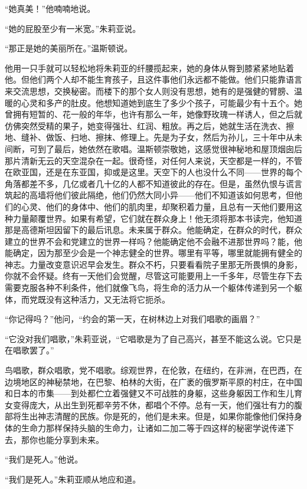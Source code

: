 ``她真美！''他喃喃地说。

``她的屁股至少有一米宽。''朱莉亚说。

``那正是她的美丽所在。''温斯顿说。

他用一只手就可以轻松地将朱莉亚的纤腰揽起来，她的身体从臀到膝紧紧地贴着他。但他们两个人却不能生育孩子，且这件事他们永远都不能做。他们只能靠语言来交流思想，交换秘密。而楼下的那个女人则没有思想，她有的是强健的臂膀、温暖的心灵和多产的肚皮。他想知道她到底生了多少个孩子，可能最少有十五个。她曾拥有短暂的、花一般的年华，也许有那么一年，她像野玫瑰一样诱人，但之后就仿佛突然受精的果子，她变得强壮、红润、粗放。再之后，她就生活在洗衣、擦地、缝补、做饭、扫地、擦抹、修理上。先是为子女，然后为孙儿，三十年中从未间断，可到了最后，她依然在歌唱。温斯顿崇敬她，这感觉很神秘地和屋顶烟囱后那片清新无云的天空混杂在一起。很奇怪，对任何人来说，天空都是一样的，不管在欧亚国，还是在东亚国，抑或是这里。天空下的人也没什么不同------世界的每个角落都差不多，几亿或者几十亿的人都不知道彼此的存在。但是，虽然仇恨与谎言筑起的高墙将他们彼此隔绝，他们仍然大同小异------他们不知道该如何思考，但他们的心灵、他们的身体中、他们的肌肉里，却聚积着力量，且总有一天他们要用这种力量颠覆世界。如果有希望，它们就在群众身上！他无须将那本书读完，他知道那是高德斯坦因留下的最后讯息。未来属于群众。他能确定，在群众的时代，群众建立的世界不会和党建立的世界一样吗？他能确定他不会融不进那世界吗？能，他能确定，因为那至少会是一个神志健全的世界。哪里有平等，哪里就能拥有健全的神志。力量改变意识迟早会发生。群众不朽，只要看看院子里那无所畏惧的身影，你就不会怀疑。终有一天他们会觉醒，尽管这可能要用上一千多年，尽管生存下去需要克服各种不利条件，他们就像飞鸟，将生命的活力从一个躯体传递到另一个躯体，而党既没有这种活力，又无法将它扼杀。

``你记得吗？''他问，``约会的第一天，在树林边上对我们唱歌的画眉？''

``它没对我们唱歌，''朱莉亚说，``它唱歌是为了自己高兴，甚至不能这么说。它只是在唱歌罢了。''

鸟唱歌，群众唱歌，党不唱歌。综观世界，在伦敦，在纽约，在非洲，在巴西，在边境地区的神秘禁地，在巴黎、柏林的大街，在广袤的俄罗斯平原的村庄，在中国和日本的市集------到处都伫立着强健又不可战胜的身躯，这些身躯因工作和生儿育女变得庞大，从出生到死都辛劳不休，都唱个不停。总有一天，他们强壮有力的腹部将生出神志清醒的民族。你是死的，他们是未来。但是，如果你能像他们保持身体的生命力那样保持头脑的生命力，让诸如二加二等于四这样的秘密学说传递下去，那你也能分享到未来。

``我们是死人。''他说。

``我们是死人。''朱莉亚顺从地应和道。

